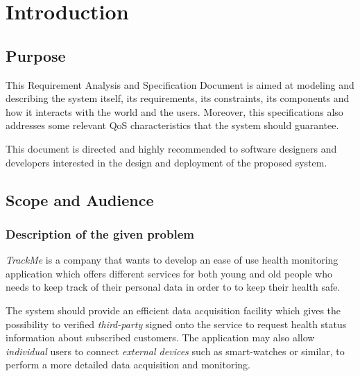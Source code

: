 \documentclass[a4paper]{article}
\begin{document}
\setlength{}{}

\tableofcontents
\newpage
{}
\renewcommand\listtablename{Use Cases Summary}
\listoftables
\newpage
{}
\renewcommand\listfigurename{UML Diagrams List}
\listoffigures
\newpage
{}
\newpage
\pagestyle{fancy}
\section{Introduction}

    \subsection{Purpose}
    This Requirement Analysis and Specification Document is aimed at modeling and describing the system itself, its requirements, its constraints, its components and how it interacts with the world and the users. Moreover, this specifications also addresses some relevant QoS characteristics that the system should guarantee. 
        
    This document is directed and highly recommended to software designers and developers interested in the design and deployment of the proposed system.
    
    \subsection{Scope and Audience}
        \subsubsection{Description of the given problem}
        \textit{TrackMe} is a company that wants to develop an ease of use health monitoring application which offers different services for both young and old people who needs to keep track of their personal data in order to to keep their health safe.
        
        The system should provide an efficient data acquisition facility which gives the possibility to verified \textit{third-party} signed onto the service to request health status information about subscribed customers. The application may also allow \textit{individual} users to connect \textit{external devices} such as smart-watches or similar, to perform a more detailed data acquisition and monitoring.
        
\end{document}
